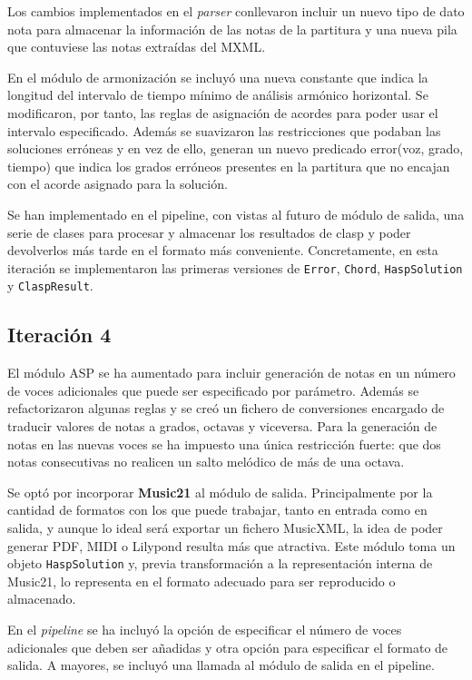 Los cambios implementados en el \textit{parser} conllevaron incluir un nuevo tipo de dato nota para almacenar la información de las notas de la partitura y una nueva pila que contuviese las notas extraídas del MXML.

En el módulo de armonización se incluyó una nueva constante que indica la longitud del intervalo de tiempo mínimo de análisis armónico horizontal. Se modificaron, por tanto, las reglas de asignación de acordes para poder usar el intervalo especificado. Además se suavizaron las restricciones que podaban las soluciones erróneas y en vez de ello, generan un nuevo predicado error(voz, grado, tiempo) que indica los grados erróneos presentes en la partitura que no encajan con el acorde asignado para la solución. 

 Se han implementado en el pipeline, con vistas al futuro de módulo de salida, una serie de clases para procesar y almacenar los resultados de clasp y poder devolverlos más tarde en el formato más conveniente. Concretamente, en esta iteración se implementaron las primeras versiones de \texttt{Error}, \texttt{Chord}, \texttt{HaspSolution} y \texttt{ClaspResult}.

\subsection{Iteración 4}
\label{sec:fourth_iteration}
El módulo ASP se ha aumentado para incluir generación de notas en un número de voces adicionales que puede ser especificado por parámetro. Además se refactorizaron algunas reglas y se creó un fichero de conversiones encargado de traducir valores de notas a grados, octavas y viceversa. Para la generación de notas en las nuevas voces se ha impuesto una única restricción fuerte: que dos notas consecutivas no realicen un salto melódico de más de una octava.

Se optó por incorporar \textbf{Music21} al módulo de salida. Principalmente por la cantidad de formatos con los que puede trabajar, tanto en entrada como en salida, y aunque lo ideal será exportar un fichero MusicXML, la idea de poder generar PDF, MIDI o Lilypond resulta más que atractiva. Este módulo toma un objeto \texttt{HaspSolution} y, previa transformación a la representación interna de Music21, lo representa en el formato adecuado para ser reproducido o almacenado.  

En el \textit{pipeline} se ha incluyó la opción de especificar el número de voces adicionales que deben ser añadidas y otra opción para especificar el formato de salida. A mayores, se incluyó una llamada al módulo de salida en el pipeline.

